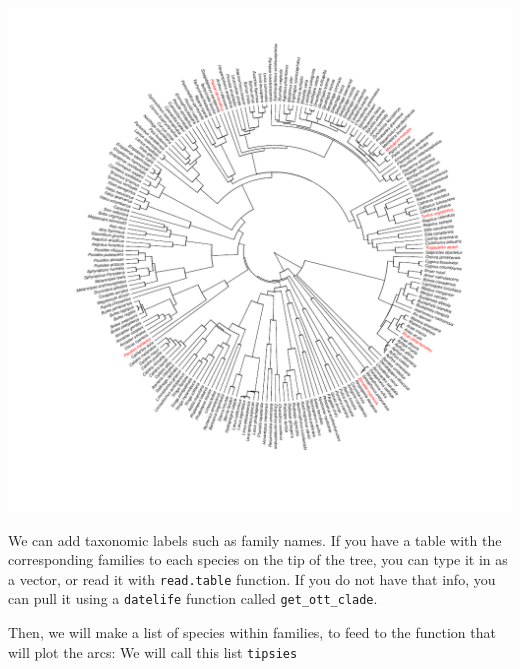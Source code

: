 \documentclass[]{article}
\newenvironment{Shaded}{\begin{snugshade}}{\end{snugshade}}
\newcommand{\ControlFlowTok}[1]{\textcolor[rgb]{0.13,0.29,0.53}{\textbf{#1}}}
\newcommand{\DataTypeTok}[1]{\textcolor[rgb]{0.13,0.29,0.53}{#1}}
\newcommand{\KeywordTok}[1]{\textcolor[rgb]{0.13,0.29,0.53}{\textbf{#1}}}
\newcommand{\NormalTok}[1]{#1}
\newcommand{\OperatorTok}[1]{\textcolor[rgb]{0.81,0.36,0.00}{\textbf{#1}}}
\newcommand{\StringTok}[1]{\textcolor[rgb]{0.31,0.60,0.02}{#1}}
\begin{document}
\begin{center}\includegraphics[width=\textwidth]{yellowstone_birds_files/figure-latex/unnamed-chunk-6-1} \end{center}

We can add taxonomic labels such as family names. If you have a table with the corresponding families to each species on the tip of the tree, you can type it in as a vector, or read it with \texttt{read.table} function.
If you do not have that info, you can pull it using a \texttt{datelife} function called \texttt{get\_ott\_clade}.

\begin{Shaded}
\end{Shaded}

Then, we will make a list of species within families, to feed to the function that will plot the arcs:
We will call this list \texttt{tipsies}

\begin{Shaded}
\end{Shaded}
\end{document}
